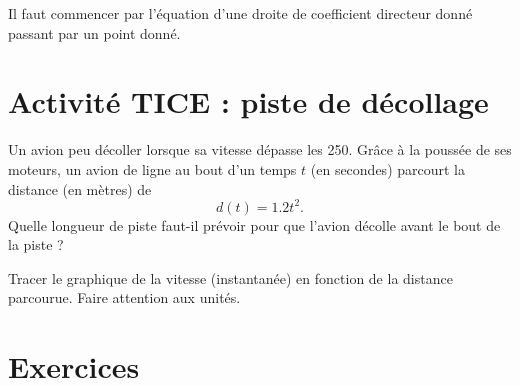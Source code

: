 
Il faut commencer par l'équation d'une droite de coefficient directeur donné passant par un point donné.

\section{Activité TICE : piste de décollage}

Un avion peu décoller lorsque sa vitesse dépasse les \unit{250}{\kilo\meter\per\hour}. Grâce à la poussée de ses moteurs, un avion de ligne au bout d'un temps \( t\) (en secondes) parcourt la distance (en mètres) de 
\begin{equation}
    d(t)=1.2t^2.
\end{equation}
Quelle longueur de piste faut-il prévoir pour que l'avion décolle avant le bout de la piste ?

Tracer le graphique de la vitesse (instantanée) en fonction de la distance parcourue. Faire attention aux unités.

\section{Exercices}

